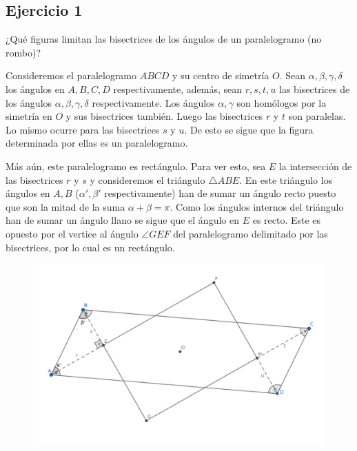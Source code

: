 


		\thispagestyle{plain}
		\subsection*{Ejercicio 1}
		¿Qué figuras limitan las bisectrices de los ángulos de un paralelogramo (no rombo)?
	\begin{sol}
		 Consideremos el paralelogramo $ABCD$ y su centro de simetría $O$. Sean $\alpha,\beta,\gamma,\delta$ los ángulos en $A,B,C,D$ respectivamente, además, sean $r,s,t,u$ las bisectrices de los ángulos $\alpha,\beta,\gamma,\delta$ respectivamente. Los ángulos $\alpha,\gamma$ son homólogos por la simetría en $O$ y sus bisectrices también. Luego las bisectrices $r$ y $t$ son paralelas. Lo mismo ocurre para las bisectrices $s$ y $u$. De esto se sigue que la figura determinada por ellas es un paralelogramo.
		
		Más aún, este paralelogramo es rectángulo. Para ver esto, sea $E$ la intersección de las bisectrices $r$ y $s$ y consideremos el triángulo $\triangle ABE$. En este triángulo los ángulos en $A,B$ ($\alpha',\beta'$  respectivamente) han de sumar un ángulo recto puesto que son la mitad de la suma $\alpha+\beta=\pi$. Como los ángulos internos del triángulo han de sumar un ángulo llano se sigue que el ángulo en $E$ es recto. Este es opuesto por el vertice al ángulo $\angle GEF$ del paralelogramo delimitado por las bisectrices, por lo cual es un rectángulo.
		\begin{figure}[H]\centering
			\includegraphics[width=1\linewidth]{pics/g1}
		\end{figure}
	\end{sol}

